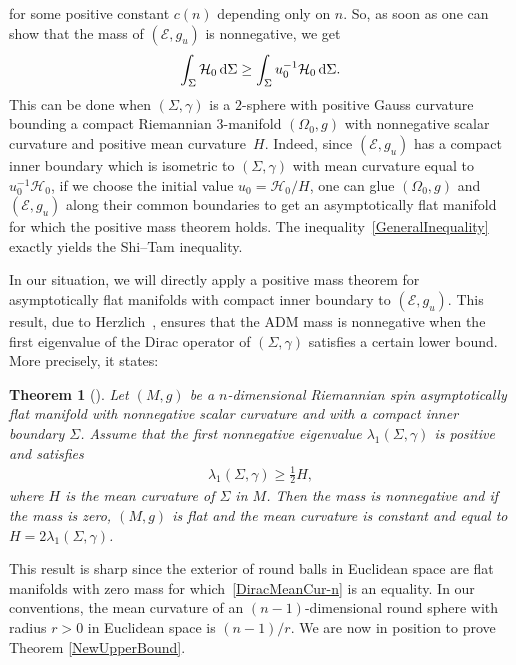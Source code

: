 \documentclass[pdftex]{sigma}
\numberwithin{equation}{section}
\newtheorem{Theorem}{Theorem}[section]
\begin{document}
for some positive constant $c(n)$ depending only on $n$. So, as soon as one can show that the mass of $(\mathcal{E},g_u)$ is nonnegative, we get
\begin{gather}\label{GeneralInequality}
\int_\Sigma \mathcal{H}_0\,{\rm d}\Sigma\geq \int_\Sigma u^{-1}_0\mathcal{H}_0\,{\rm d}\Sigma.
\end{gather}
This can be done when $(\Sigma,\gamma)$ is a $2$-sphere with positive Gauss curvature bounding a compact Riemannian $3$-manifold $(\Omega_0,g)$ with nonnegative scalar curvature and positive mean curvature~$H$. Indeed, since $(\mathcal{E},g_u)$ has a compact inner boundary which is isometric to $(\Sigma,\gamma)$ with mean curvature equal to $u_0^{-1}\mathcal{H}_0$, if we choose the initial value $u_0=\mathcal{H}_0/H$, one can glue $(\Omega_0,g)$ and $(\mathcal{E},g_u)$ along their common boundaries to get an asymptotically flat manifold for which the positive mass theorem holds. The inequality~\eqref{GeneralInequality} exactly yields the Shi--Tam inequality.

In our situation, we will directly apply a positive mass theorem for asymptotically flat manifolds with compact inner boundary to $(\mathcal{E},g_u)$. This result, due to Herzlich~\cite{Herzlich1,Herzlich2}, ensures that the ADM mass is nonnegative when the first eigenvalue of the Dirac operator of $(\Sigma,\gamma)$ satisfies a certain lower bound. More precisely, it states:
\begin{Theorem}[\cite{Herzlich1,Herzlich2}]\label{HerzlichPMT-n}
Let $(M,g)$ be a $n$-dimensional Riemannian spin asymptotically flat manifold with nonnegative scalar curvature and with a compact inner boundary $\Sigma$. Assume that the first nonnegative eigenvalue $\lambda_1(\Sigma,\gamma)$ is positive and satisfies
\begin{gather}\label{DiracMeanCur-n}
\lambda_1(\Sigma,\gamma)\geq\frac{1}{2}H,
\end{gather}
where $H$ is the mean curvature of $\Sigma$ in $M$. Then the mass is nonnegative and if the mass is zero, $(M,g)$ is flat and the mean curvature is constant and equal to $H=2\lambda_1(\Sigma,\gamma)$.
\end{Theorem}
This result is sharp since the exterior of round balls in Euclidean space are flat manifolds with zero mass for which~\eqref{DiracMeanCur-n} is an equality. In our conventions, the mean curvature of an $(n-1)$-dimensional round sphere with radius $r>0$ in Euclidean space is $(n-1)/r$. We are now in position to prove Theorem \ref{NewUpperBound}.
\end{document}
